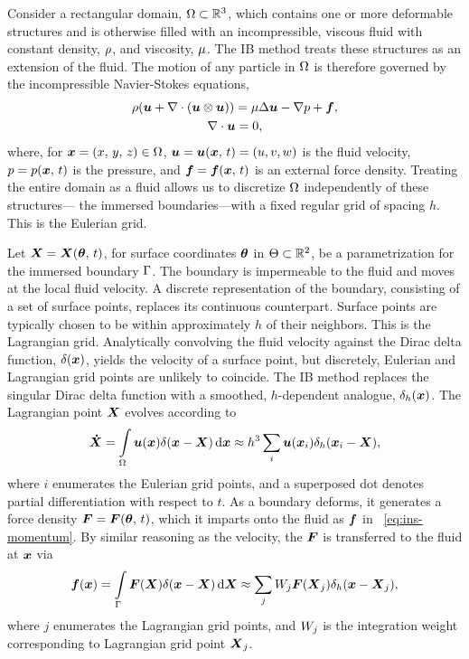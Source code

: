 Consider a rectangular domain, $\Omega\subset\mathbb{R}^3$, which contains one or more
deformable structures and is otherwise filled with an incompressible, viscous fluid with
constant density, $\rho$, and viscosity, $\mu$. The IB method treats these
structures as an extension of the fluid. The motion of any particle in $\Omega$ is
therefore governed by the incompressible Navier-Stokes equations,
\begin{gather}
    \density(\u + \div(\u\otimes\u)) = \viscosity\laplacian \u - \grad p + \f, \label{eq:ins-momentum} \\
    \div \u = 0, \label{eq:ins-incomp}
\end{gather}
where, for $\boldsymbol{x} = (x,\,y,\,z) \in \Omega$, $\boldsymbol{u} = \boldsymbol{u}(\boldsymbol{x},\,t) = (u, v, w)$ is the fluid
velocity, $p = p(\boldsymbol{x},\,t)$ is the pressure, and $\boldsymbol{f} = \boldsymbol{f}(\boldsymbol{x},\,t)$ is an external force
density. Treating the entire domain as a fluid allows us to discretize $\Omega$
independently of these structures--- the immersed boundaries---with a fixed regular grid
of spacing $h$. This is
the Eulerian grid.


Let $\boldsymbol{X} = \boldsymbol{X}(\boldsymbol{\theta},\,t)$, for surface coordinates $\boldsymbol{\theta}$ in $\Theta\subset\mathbb{R}^2$, be
a parametrization for the immersed boundary $\Gamma$. The boundary is impermeable to
the fluid and moves at the local fluid velocity. A discrete representation of the
boundary, consisting of a set of surface points, replaces its continuous counterpart.
Surface points are typically chosen to be within approximately $h$ of their neighbors.
This is the Lagrangian grid. Analytically convolving the fluid velocity against the Dirac
delta function, $\delta(\boldsymbol{x})$, yields the velocity of a surface point, but discretely,
Eulerian and Lagrangian grid points are unlikely to coincide. The IB method replaces the
singular Dirac delta function with a smoothed, $h$-dependent analogue, $\delta_h(\boldsymbol{x})$.
The Lagrangian point $\boldsymbol{X}$ evolves according to
\begin{equation}\label{eq:ib-interp}
    \vec{\dot{X}}
        = \int\limits_{\domain} \u(\x) \Dirac(\x-\X) \d\x
        \approx h^3 \sum_{i} \u(\x_i) \Dirac_h(\x_i-\X),
\end{equation}
where $i$ enumerates the Eulerian grid points, and a superposed dot denotes partial
differentiation with respect to $t$. As a boundary deforms, it generates a force density
$\boldsymbol{F} = \boldsymbol{F}(\boldsymbol{\theta},\,t)$, which it imparts onto the fluid as $\boldsymbol{f}$ in~ \eqref{eq:ins-momentum}.
By similar reasoning as the velocity, the $\boldsymbol{F}$ is transferred to the fluid at $\boldsymbol{x}$ via
\begin{equation}\label{eq:ib-spread}
        \f(\x)
        = \int\limits_{\interface} \F(\X)\Dirac(\x-\X) \d\X
        \approx \sum_{j} \weight[j]\F(\X_j) \Dirac_h(\x-\X_j),
\end{equation}
where $j$ enumerates the Lagrangian grid points, and $\weight[j]$ is the integration
weight corresponding to Lagrangian grid point $\boldsymbol{X}_j$.

